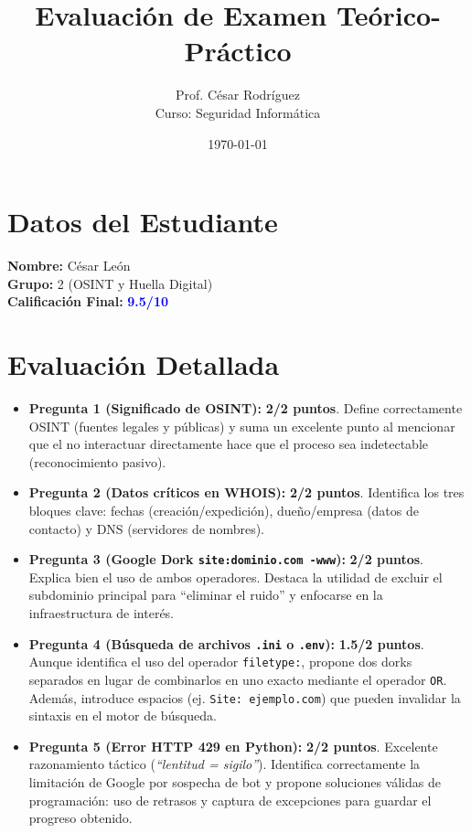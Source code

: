 \documentclass[12pt,a4paper]{article}
\title{Evaluación de Examen Teórico-Práctico}
\author{Prof. César Rodríguez \\ \small Curso: Seguridad Informática}
\date{\today}
\begin{document}
\maketitle

\section*{Datos del Estudiante}
\textbf{Nombre:} César León \\
\textbf{Grupo:} 2 (OSINT y Huella Digital) \\
\textbf{Calificación Final:} \textbf{\textcolor{blue}{9.5/10}}

\section*{Evaluación Detallada}

\begin{itemize}[label=$\bullet$]
    \item \textbf{Pregunta 1 (Significado de OSINT):} \textbf{2/2 puntos}. Define correctamente OSINT (fuentes legales y públicas) y suma un excelente punto al mencionar que el no interactuar directamente hace que el proceso sea indetectable (reconocimiento pasivo).
    
    \item \textbf{Pregunta 2 (Datos críticos en WHOIS):} \textbf{2/2 puntos}. Identifica los tres bloques clave: fechas (creación/expedición), dueño/empresa (datos de contacto) y DNS (servidores de nombres).
    
    \item \textbf{Pregunta 3 (Google Dork \texttt{site:dominio.com -www}):} \textbf{2/2 puntos}. Explica bien el uso de ambos operadores. Destaca la utilidad de excluir el subdominio principal para ``eliminar el ruido'' y enfocarse en la infraestructura de interés.
    
    \item \textbf{Pregunta 4 (Búsqueda de archivos \texttt{.ini} o \texttt{.env}):} \textbf{1.5/2 puntos}. Aunque identifica el uso del operador \texttt{filetype:}, propone dos dorks separados en lugar de combinarlos en uno exacto mediante el operador \texttt{OR}. Además, introduce espacios (ej. \texttt{Site: ejemplo.com}) que pueden invalidar la sintaxis en el motor de búsqueda.
    
    \item \textbf{Pregunta 5 (Error HTTP 429 en Python):} \textbf{2/2 puntos}. Excelente razonamiento táctico (\textit{``lentitud = sigilo''}). Identifica correctamente la limitación de Google por sospecha de bot y propone soluciones válidas de programación: uso de retrasos y captura de excepciones para guardar el progreso obtenido.
\end{itemize}
\end{document}
